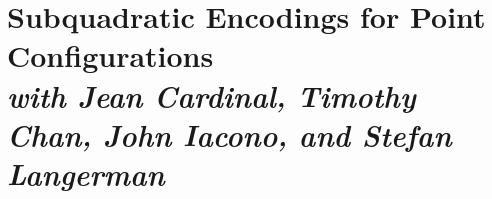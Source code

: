 \chapter%
[Subquadratic Encodings for Point Configurations]%
{Subquadratic Encodings for Point Configurations\\[1ex]
\normalfont\footnotesize\itshape with Jean Cardinal,
Timothy Chan,
John Iacono,
and Stefan Langerman}%
\label{paper:order-type-encoding}









